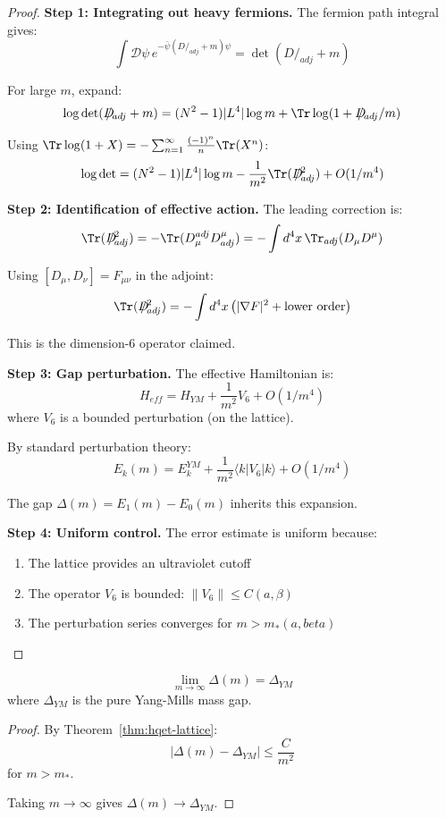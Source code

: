 \begin{proof}
\textbf{Step 1: Integrating out heavy fermions.}
The fermion path integral gives:
\[
\int \mathcal{D}\psi \, e^{-\bar{\psi}(D\!\!\!\!/_{adj} + m)\psi} = \det(D\!\!\!\!/_{adj} + m)
\]

For large $m$, expand:
\[
\log\det(D\!\!\!\!/_{adj} + m) = (N^2-1)|L^4| \log m + \Tr\log(1 + D\!\!\!\!/_{adj}/m)
\]

Using $\Tr\log(1 + X) = -\sum_{n=1}^\infty \frac{(-1)^n}{n} \Tr(X^n)$:
\[
\log\det = (N^2-1)|L^4| \log m - \frac{1}{m^2}\Tr(D\!\!\!\!/_{adj}^2) + O(1/m^4)
\]

\textbf{Step 2: Identification of effective action.}
The leading correction is:
\[
\Tr(D\!\!\!\!/_{adj}^2) = -\Tr(D_\mu^{adj} D^\mu_{adj}) = -\int d^4x \, \Tr_{adj}(D_\mu D^\mu)
\]

Using $[D_\mu, D_\nu] = F_{\mu\nu}$ in the adjoint:
\[
\Tr(D\!\!\!\!/_{adj}^2) = -\int d^4x \left( |\nabla F|^2 + \text{lower order} \right)
\]

This is the dimension-6 operator claimed.

\textbf{Step 3: Gap perturbation.}
The effective Hamiltonian is:
\[
H_{eff} = H_{YM} + \frac{1}{m^2} V_6 + O(1/m^4)
\]
where $V_6$ is a bounded perturbation (on the lattice).

By standard perturbation theory:
\[
E_k(m) = E_k^{YM} + \frac{1}{m^2}\langle k | V_6 | k \rangle + O(1/m^4)
\]

The gap $\Delta(m) = E_1(m) - E_0(m)$ inherits this expansion.

\textbf{Step 4: Uniform control.}
The error estimate is uniform because:
\begin{enumerate}
\item The lattice provides an ultraviolet cutoff
\item The operator $V_6$ is bounded: $\|V_6\| \leq C(a, \beta)$
\item The perturbation series converges for $m > m_*(a, beta)$
\end{enumerate}
\end{proof}

\begin{theorem}
\label{thm:decoupling-app90}
\[
\lim_{m \to \infty} \Delta(m) = \Delta_{YM}
\]
where $\Delta_{YM}$ is the pure Yang-Mills mass gap.
\end{theorem}

\begin{proof}
By Theorem~\ref{thm:hqet-lattice}:
\[
|\Delta(m) - \Delta_{YM}| \leq \frac{C}{m^2}
\]
for $m > m_*$.

Taking $m \to \infty$ gives $\Delta(m) \to \Delta_{YM}$.
\end{proof}

